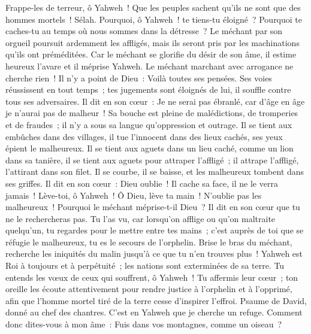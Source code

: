 \begin{multicols}{2}
Frappe-les de terreur, ô Yahweh~! Que les peuples sachent qu'ils ne sont que des hommes mortels~! Sélah.
\VerseOne{}Pourquoi, ô Yahweh~! te tiens-tu éloigné~? Pourquoi te caches-tu au temps où nous sommes dans la détresse~?
Le méchant par son orgueil poursuit ardemment les affligés, mais ils seront pris par les machinations qu'ils ont préméditées.
Car le méchant se glorifie du désir de son âme, il estime heureux l'avare et il méprise Yahweh.
Le méchant marchant avec arrogance ne cherche rien~! Il n'y a point de Dieu~: Voilà toutes ses pensées.
Ses voies réussissent en tout temps~; tes jugements sont éloignés de lui, il souffle contre tous ses adversaires.
Il dit en son cœur~: Je ne serai pas ébranlé, car d'âge en âge je n'aurai pas de malheur~!
Sa bouche est pleine de malédictions, de tromperies et de fraudes~; il n'y a sous sa langue qu'oppression et outrage.
Il se tient aux embûches dans des villages, il tue l'innocent dans des lieux cachés, ses yeux épient le malheureux.
Il se tient aux aguets dans un lieu caché, comme un lion dans sa tanière, il se tient aux aguets pour attraper l'affligé~; il attrape l'affligé, l'attirant dans son filet.
Il se courbe, il se baisse, et les malheureux tombent dans ses griffes.
Il dit en son cœur~: Dieu oublie~! Il cache sa face, il ne le verra jamais~!
Lève-toi, ô Yahweh~! Ô Dieu, lève ta main~! N'oublie pas les malheureux~!
Pourquoi le méchant méprise-t-il Dieu~? Il dit en son cœur que tu ne le rechercheras pas.
Tu l'as vu, car lorsqu'on afflige ou qu'on maltraite quelqu'un, tu regardes pour le mettre entre tes mains~; c'est auprès de toi que se réfugie le malheureux, tu es le secours de l'orphelin.
Brise le bras du méchant, recherche les iniquités du malin jusqu'à ce que tu n'en trouves plus~!
Yahweh est Roi à toujours et à perpétuité~; les nations sont exterminées de sa terre.
Tu entends les vœux de ceux qui souffrent, ô Yahweh~! Tu affermis leur cœur~; ton oreille les écoute attentivement
pour rendre justice à l'orphelin et à l'opprimé, afin que l'homme mortel tiré de la terre cesse d'inspirer l'effroi.
\VerseOne{}Psaume de David, donné au chef des chantres. C'est en Yahweh que je cherche un refuge. Comment donc dites-vous à mon âme~: Fuis dans vos montagnes, comme un oiseau~?

\end{multicols}
